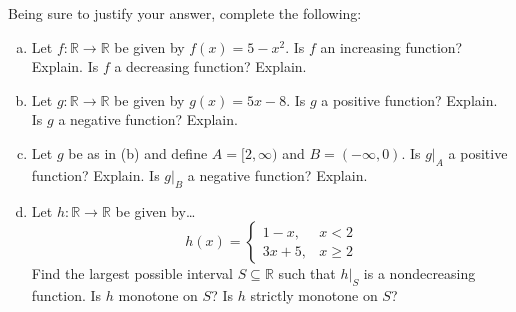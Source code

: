 \documentclass[11pt,letterpaper]{article}
\begin{document}
 Being sure to justify your answer, complete the following:
	\begin{enumerate}[(a)]
	\item Let $f: \mathbb{R} \to \mathbb{R}$ be given by $f(x)= 5 - x^2$. Is $f$ an increasing function? Explain. Is $f$ a decreasing function? Explain. 
	\item Let $g: \mathbb{R} \to \mathbb{R}$ be given by $g(x)= 5x - 8$. Is $g$ a positive function? Explain. Is $g$ a negative function? Explain. 
	\item Let $g$ be as in (b) and define $A= [2, \infty)$ and $B= (-\infty, 0)$. Is $g \big|_A$ a positive function? Explain. Is $g \big|_B$ a negative function? Explain. 
	\item Let $h: \mathbb{R} \to \mathbb{R}$ be given by\dots
		\[
		h(x)= 
		\begin{cases}
		1 - x, & x < 2 \\
		3x + 5, & x \geq 2
		\end{cases}
		\]
	Find the largest possible interval $S \subseteq \mathbb{R}$ such that $h \big|_S$ is a nondecreasing function. Is $h$ monotone on $S$? Is $h$ strictly monotone on $S$?
	\end{enumerate} \pspace
\end{document}
